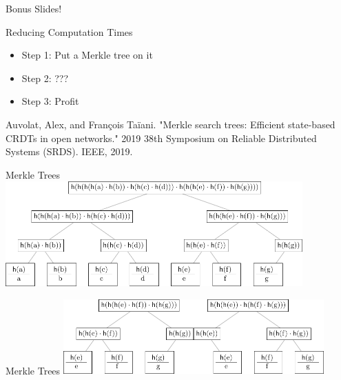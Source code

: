 \documentclass{beamer}
\begin{document}
\begin{frame}{Bonus Slides!}
    
\end{frame}

\begin{frame}{Reducing Computation Times}
    \begin{itemize}
        \item Step 1: Put a Merkle tree on it
        \item Step 2: ???
        \item Step 3: Profit
    \end{itemize}

    \vfill

    Auvolat, Alex, and François Taïani. "Merkle search trees: Efficient state-based CRDTs in open networks." 2019 38th Symposium on Reliable Distributed Systems (SRDS). IEEE, 2019.
\end{frame}

\begin{frame}{Merkle Trees}
    \includegraphics[keepaspectratio=true,width=11.4cm]{merkle1.pdf}
\end{frame}

\begin{frame}{Merkle Trees}
    \includegraphics[keepaspectratio=true,width=5cm]{merkle2.pdf}\hfill\includegraphics[keepaspectratio=true,width=5cm]{merkle3.pdf}
\end{frame}
\end{document}
